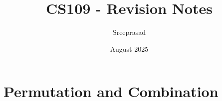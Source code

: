 \documentclass{article}
\title{CS109 - Revision Notes}
\author{Sreeprasad}
\date{August 2025}
\begin{document}
\maketitle

\section{Permutation and Combination}

\end{document}
